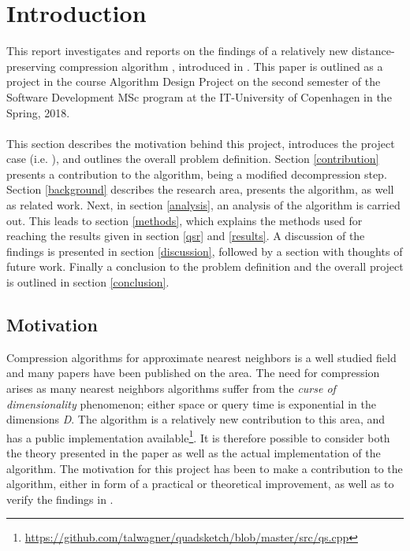 \section{Introduction}
\label{introduction}
This report investigates and reports on the findings of a relatively new distance-preserving compression algorithm \qs{}, introduced in \cite{wagner17}. This paper is outlined as a project in the course Algorithm Design Project on the second semester of the Software Development MSc program at the IT-University of Copenhagen in the Spring, 2018.
\\
\\
This section describes the motivation behind this project, introduces the project case (i.e. \qs{}), and outlines the overall problem definition. Section \ref{contribution} presents a contribution to the algorithm, being a modified decompression step. Section \ref{background} describes the research area, presents the \qs{} algorithm, as well as related work. Next, in section \ref{analysis}, an analysis of the algorithm is carried out. This leads to section \ref{methods}, which explains the methods used for reaching the results given in section \ref{qsr} and \ref{results}. A discussion of the findings is presented in section \ref{discussion}, followed by a section with thoughts of future work. Finally a conclusion to the problem definition and the overall project is outlined in section \ref{conclusion}.

\subsection{Motivation} %
Compression algorithms for approximate nearest neighbors is a well studied field and many papers have been published on the area. The need for compression arises as many nearest neighbors algorithms suffer from the \textit{curse of dimensionality} phenomenon; either space or query time is exponential in the dimensions \textit{D}\cite{ilya15}. The \qs{} algorithm is a relatively new contribution to this area, and has a public implementation available\footnote{\url{https://github.com/talwagner/quadsketch/blob/master/src/qs.cpp}}. It is therefore possible to consider both the theory presented in the paper as well as the actual implementation of the algorithm. The motivation for this project has been to make a contribution to the algorithm, either in form of a practical or theoretical improvement, as well as to verify the findings in \cite{wagner17}.

